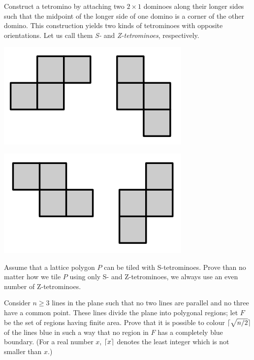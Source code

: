 \begin{problem}

Construct a tetromino by attaching two $2 \times 1$ dominoes along their longer sides such that the midpoint of the longer side of one domino is a corner of the other domino. This construction yields two kinds of tetrominoes with opposite orientations. Let us call them \textit{S-} and \textit{Z-tetrominoes}, respectively.

\begin{center}

\centering
\begin{minipage}{.5\textwidth}
  \centering
  \includegraphics[width=.4\linewidth]{stetramino.png}
  \label{fig:test1}
\end{minipage}%
\begin{minipage}{.5\textwidth}
  \centering
  \includegraphics[width=.4\linewidth]{z-tetramino.png}
  \label{fig:test2}
\end{minipage}

\end{center}



Assume that a lattice polygon $P$ can be tiled with S-tetrominoes. Prove than no matter how we tile $P$ using only S- and Z-tetrominoes, we always use an even number of Z-tetrominoes.

\end{problem}

\begin{problem}
Consider $n \ge 3$ lines in the plane such that no two lines are parallel and no three have a common point. These lines divide the plane into polygonal regions; let $F$ be the set of regions having finite area. Prove that it is possible to colour $\lceil\sqrt{n/2}\rceil$ of the lines blue in such a way that no region in $F$ has a completely blue boundary. (For a real number $x$, $\lceil x\rceil$ denotes the least integer which is not smaller than $x$.)

\end{problem}

